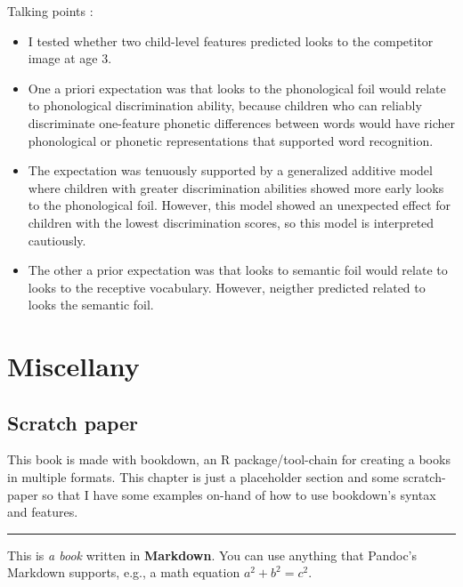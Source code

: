 \documentclass [11pt, proquest] {uwthesis}[2015/03/03]
\providecommand{\tightlist}{%
  \setlength{\itemsep}{0pt}\setlength{\parskip}{0pt}}
\begin{document}
Talking points :
\begin{itemize}
\tightlist
\item
  I tested whether two child-level features predicted looks to the
  competitor image at age 3.
\item
  One a priori expectation was that looks to the phonological foil would
  relate to phonological discrimination ability, because children who
  can reliably discriminate one-feature phonetic differences between
  words would have richer phonological or phonetic representations that
  supported word recognition.
\item
  The expectation was tenuously supported by a generalized additive
  model where children with greater discrimination abilities showed more
  early looks to the phonological foil. However, this model showed an
  unexpected effect for children with the lowest discrimination scores,
  so this model is interpreted cautiously.
\item
  The other a prior expectation was that looks to semantic foil would
  relate to looks to the receptive vocabulary. However, neigther
  predicted related to looks the semantic foil.
\end{itemize}
\part*{Miscellany}\label{part-misc}

\chapter{Scratch paper}\label{scratch-paper}

This book is made with bookdown, an R package/tool-chain for creating a
books in multiple formats. This chapter is just a placeholder section
and some scratch-paper so that I have some examples on-hand of how to
use bookdown's syntax and features.
\begin{center}\rule{0.5\linewidth}{\linethickness}\end{center}

This is \emph{a book} written in \textbf{Markdown}. You can use anything
that Pandoc's Markdown supports, e.g., a math equation
\(a^2 + b^2 = c^2\).
\end{document}
